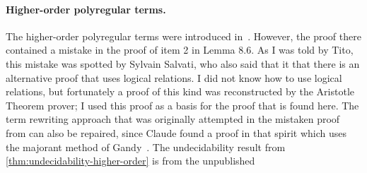 \paragraph*{Higher-order polyregular terms.} The higher-order polyregular terms were introduced in~\cite[Section 4]{bojanczykPolyregularFunctions2018}. However, the proof there contained a mistake in the proof of item 2 in  Lemma 8.6.  As I was told by Tito, this mistake was spotted by Sylvain Salvati, who also said that it that there is an alternative proof that uses logical relations. I did not know how to use logical relations, but fortunately a proof of this kind was reconstructed by   the Aristotle Theorem prover; I used this proof as a basis for the proof that is found here. The term rewriting approach that was originally attempted in the mistaken proof from  \cite{bojanczykPolyregularFunctions2018} can also be repaired, since Claude found a proof in that spirit which uses the majorant method of Gandy~\cite{Gandy1980}. The undecidability result from \cref{thm:undecidability-higher-order} is from the unpublished